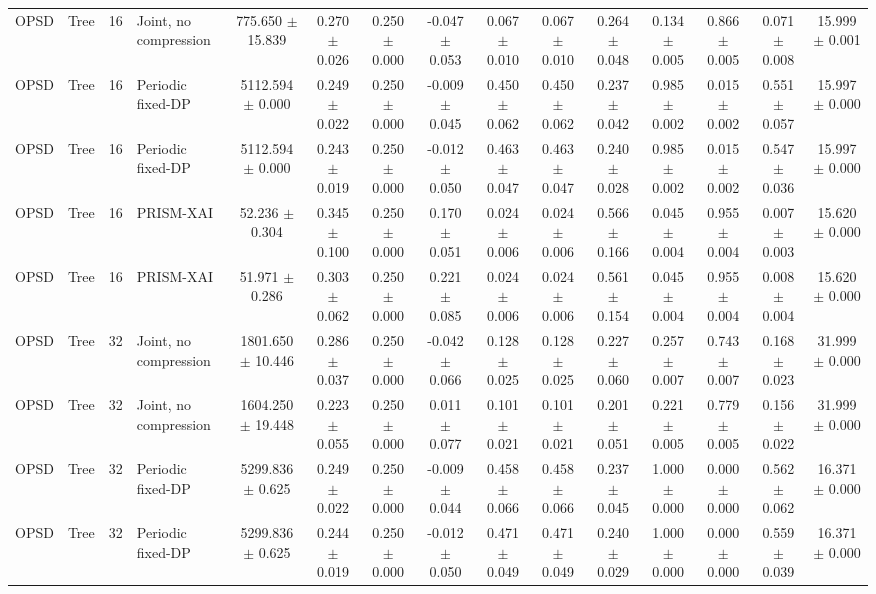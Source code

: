 \begin{table}[t]
\begin{tabular}{llllccccccccccc}
OPSD & Tree & 16 & Joint, no compression & 775.650 $\pm$ 15.839 & 0.270 $\pm$ 0.026 & 0.250 $\pm$ 0.000 & -0.047 $\pm$ 0.053 & 0.067 $\pm$ 0.010 & 0.067 $\pm$ 0.010 & 0.264 $\pm$ 0.048 & 0.134 $\pm$ 0.005 & 0.866 $\pm$ 0.005 & 0.071 $\pm$ 0.008 & 15.999 $\pm$ 0.001 \\
OPSD & Tree & 16 & Periodic fixed-DP & 5112.594 $\pm$ 0.000 & 0.249 $\pm$ 0.022 & 0.250 $\pm$ 0.000 & -0.009 $\pm$ 0.045 & 0.450 $\pm$ 0.062 & 0.450 $\pm$ 0.062 & 0.237 $\pm$ 0.042 & 0.985 $\pm$ 0.002 & 0.015 $\pm$ 0.002 & 0.551 $\pm$ 0.057 & 15.997 $\pm$ 0.000 \\
OPSD & Tree & 16 & Periodic fixed-DP & 5112.594 $\pm$ 0.000 & 0.243 $\pm$ 0.019 & 0.250 $\pm$ 0.000 & -0.012 $\pm$ 0.050 & 0.463 $\pm$ 0.047 & 0.463 $\pm$ 0.047 & 0.240 $\pm$ 0.028 & 0.985 $\pm$ 0.002 & 0.015 $\pm$ 0.002 & 0.547 $\pm$ 0.036 & 15.997 $\pm$ 0.000 \\
OPSD & Tree & 16 & PRISM-XAI & 52.236 $\pm$ 0.304 & 0.345 $\pm$ 0.100 & 0.250 $\pm$ 0.000 & 0.170 $\pm$ 0.051 & 0.024 $\pm$ 0.006 & 0.024 $\pm$ 0.006 & 0.566 $\pm$ 0.166 & 0.045 $\pm$ 0.004 & 0.955 $\pm$ 0.004 & 0.007 $\pm$ 0.003 & 15.620 $\pm$ 0.000 \\
OPSD & Tree & 16 & PRISM-XAI & 51.971 $\pm$ 0.286 & 0.303 $\pm$ 0.062 & 0.250 $\pm$ 0.000 & 0.221 $\pm$ 0.085 & 0.024 $\pm$ 0.006 & 0.024 $\pm$ 0.006 & 0.561 $\pm$ 0.154 & 0.045 $\pm$ 0.004 & 0.955 $\pm$ 0.004 & 0.008 $\pm$ 0.004 & 15.620 $\pm$ 0.000 \\
OPSD & Tree & 32 & Joint, no compression & 1801.650 $\pm$ 10.446 & 0.286 $\pm$ 0.037 & 0.250 $\pm$ 0.000 & -0.042 $\pm$ 0.066 & 0.128 $\pm$ 0.025 & 0.128 $\pm$ 0.025 & 0.227 $\pm$ 0.060 & 0.257 $\pm$ 0.007 & 0.743 $\pm$ 0.007 & 0.168 $\pm$ 0.023 & 31.999 $\pm$ 0.000 \\
OPSD & Tree & 32 & Joint, no compression & 1604.250 $\pm$ 19.448 & 0.223 $\pm$ 0.055 & 0.250 $\pm$ 0.000 & 0.011 $\pm$ 0.077 & 0.101 $\pm$ 0.021 & 0.101 $\pm$ 0.021 & 0.201 $\pm$ 0.051 & 0.221 $\pm$ 0.005 & 0.779 $\pm$ 0.005 & 0.156 $\pm$ 0.022 & 31.999 $\pm$ 0.000 \\
OPSD & Tree & 32 & Periodic fixed-DP & 5299.836 $\pm$ 0.625 & 0.249 $\pm$ 0.022 & 0.250 $\pm$ 0.000 & -0.009 $\pm$ 0.044 & 0.458 $\pm$ 0.066 & 0.458 $\pm$ 0.066 & 0.237 $\pm$ 0.045 & 1.000 $\pm$ 0.000 & 0.000 $\pm$ 0.000 & 0.562 $\pm$ 0.062 & 16.371 $\pm$ 0.000 \\
OPSD & Tree & 32 & Periodic fixed-DP & 5299.836 $\pm$ 0.625 & 0.244 $\pm$ 0.019 & 0.250 $\pm$ 0.000 & -0.012 $\pm$ 0.050 & 0.471 $\pm$ 0.049 & 0.471 $\pm$ 0.049 & 0.240 $\pm$ 0.029 & 1.000 $\pm$ 0.000 & 0.000 $\pm$ 0.000 & 0.559 $\pm$ 0.039 & 16.371 $\pm$ 0.000 \\

\end{tabular}
\end{table}
